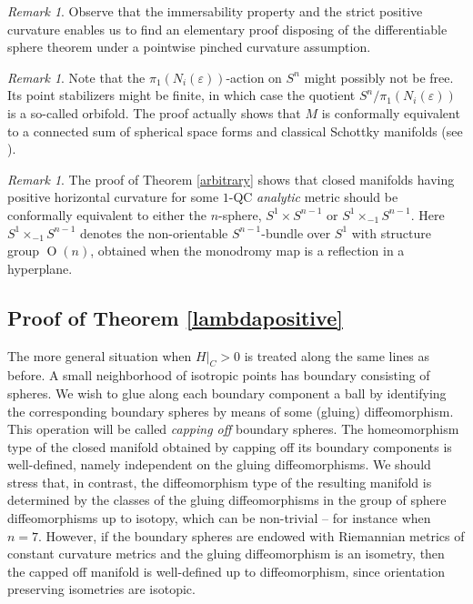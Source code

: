 \documentclass[JEP,XML,SOM,Unicode]{cedram}
\DeclareMathOperator{\rO}{O}
\theoremstyle{definition}
\theoremstyle{remark}
\newtheorem{remark}[theorem]{Remark}
\numberwithin{equation}{section}
\begin{document}
\begin{remark}
Observe that the immersability property and
the strict positive curvature enables
us to find an elementary proof disposing
of the differentiable sphere theorem under
a pointwise pinched curvature assumption.
\end{remark}

\begin{remark}
Note that the $\pi_1(N_i(\varepsilon))$-action on $S^n$ might possibly not be free.
Its point stabilizers might be finite, in which case the quotient $S^n/\pi_1(N_i(\varepsilon))$ is a so-called orbifold.
The proof actually shows that $M$ is conformally equivalent
to a connected sum of spherical space forms and classical Schottky
manifolds (see \cite{Pi}).
\end{remark}

\begin{remark}
The proof of Theorem \ref{arbitrary} shows that closed manifolds having
positive horizontal curvature for some $1$-QC
\emph{analytic} metric should be conformally equivalent to either
the $n$-sphere, $S^1\times S^{n-1}$ or $S^1\times_{-1}S^{n-1}$.
Here $S^1\times_{-1}S^{n-1}$ denotes the non-orientable $S^{n-1}$-bundle
over $S^1$ with structure group $\rO(n)$, \ie obtained when the monodromy map
is a reflection in a hyperplane.
\end{remark}

\subsection{Proof of Theorem \ref{lambdapositive}}
The more general situation when $H|_C>0$ is treated along the same lines as before.
A small neighborhood of isotropic points has boundary consisting of spheres.
We wish to glue along each boundary component a ball by identifying the corresponding boundary spheres
by means of some (gluing) diffeomorphism. This operation will be called \emph{capping off} boundary spheres.
The homeomorphism type of the closed manifold obtained by capping off its boundary components is well-defined,
namely independent on the gluing diffeomorphisms. We should stress that, in contrast, the diffeomorphism type of
the resulting manifold is determined by the classes of the gluing diffeomorphisms
in the group of sphere diffeomorphisms up to isotopy, which can be non-trivial -- for instance when $n=7$.
However, if the boundary spheres are endowed with Riemannian metrics of constant curvature metrics
and the gluing diffeomorphism is an isometry, then the capped off manifold is well-defined up to diffeomorphism, since
orientation preserving isometries are isotopic.
\end{document}

